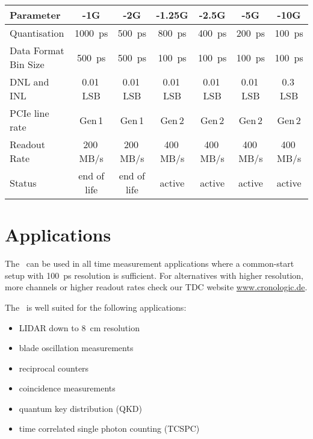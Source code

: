 	\noindent
	\begin{tabularx}{\textwidth}{|X|c|c|c|c|c|c|}
		\hline
		Parameter & -1G & -2G & -1.25G & -2.5G & -5G & -10G\\
		\hline\hline
		Quantisation & \SI{1000}{\pico\second} & \SI{500}{\pico\second} & \SI{800}{\pico\second} & \SI{400}{\pico\second} & \SI{200}{\pico\second} & \SI{100}{\pico\second} \\
		\hline
		Data Format Bin Size & \SI{500}{\pico\second} & \SI{500}{\pico\second} & \SI{100}{\pico\second} & \SI{100}{\pico\second} & \SI{100}{\pico\second} & \SI{100}{\pico\second} \\
		\hline 
		DNL and INL & 0.01\,LSB & 0.01\,LSB & 0.01\,LSB & 0.01\,LSB & 0.01\,LSB & 0.3\,LSB \\
		\hline 
		PCIe line rate & Gen\,1 & Gen\,1 & Gen\,2 & Gen\,2 & Gen\,2 & Gen\,2\\  
		\hline 
		Readout Rate & 200\,MB/s & 200\,MB/s & 400\,MB/s & 400\,MB/s & 400\,MB/s & 400\,MB/s\\ 
		\hline 
		Status & end of life & end of life & active & active & active & active \\
		\hline
   \end{tabularx}  

\section{Applications}
	The \deviceName\  can be used in all time measurement applications where a common-start setup with \SI{100}{\pico\second} resolution is sufficient. 
	For alternatives with higher resolution, more channels or higher readout rates check our TDC website \href{https://www.cronologic.de/produkte/products-overview#tdcdata}{www.cronologic.de}.

	The \deviceName\ is well suited for the following applications:
	\begin{itemize}
		\item LIDAR down to \SI{8}{\centi\meter} resolution
		\item blade oscillation measurements
		\item reciprocal counters
		\item coincidence measurements
		\item quantum key distribution (QKD)
		\item time correlated single photon counting (TCSPC)
	\end{itemize} 
